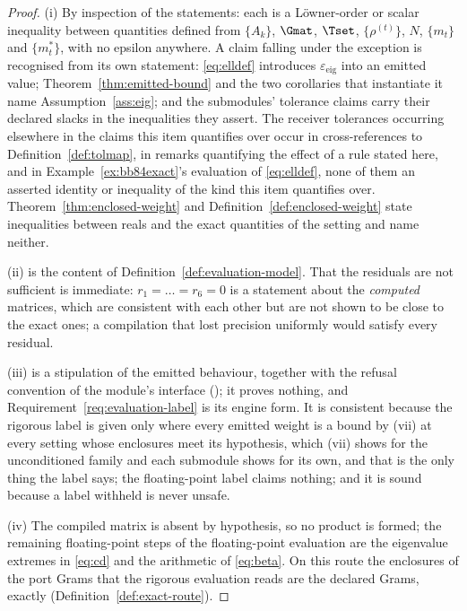 \begin{proof}
(i) By inspection of the statements: each is a Löwner-order or scalar
inequality between quantities defined from $\{A_k\}$, $\Gmat$, $\Tset$,
$\{\rho^{(t)}\}$, $N$, $\{m_t\}$ and $\{m^{\ast}_t\}$, with no epsilon
anywhere. A claim falling under the exception is recognised from its own
statement: \eqref{eq:elldef} introduces $\varepsilon_{\mathrm{eig}}$ into an
emitted value; Theorem~\ref{thm:emitted-bound} and the two corollaries that
instantiate it name Assumption~\ref{ass:eig}; and the submodules' tolerance
claims carry their declared slacks in the inequalities they assert. The
receiver tolerances occurring elsewhere in the claims this item quantifies over
occur in cross-references to Definition~\ref{def:tolmap}, in remarks
quantifying the effect of a rule stated here, and in
Example~\ref{ex:bb84exact}'s evaluation of \eqref{eq:elldef}, none of them an
asserted identity or inequality of the kind this item quantifies over.
Theorem~\ref{thm:enclosed-weight} and Definition~\ref{def:enclosed-weight}
state inequalities between reals and the exact quantities of the setting and
name neither.

(ii) is the content of Definition~\ref{def:evaluation-model}. That the residuals are not
sufficient is immediate: $r_1=\dots=r_6=0$ is a statement about the
\emph{computed} matrices, which are consistent with each other but are not
shown to be close to the exact ones; a compilation that lost precision
uniformly would satisfy every residual.

(iii) is a stipulation of the emitted behaviour, together with the refusal
convention of the module's interface
(); it proves nothing, and
Requirement~\ref{req:evaluation-label} is its engine form. It is consistent
because the rigorous label is given only where every emitted weight is a bound
by (vii) at every setting whose enclosures meet its hypothesis, which (vii)
shows for the unconditioned family and each submodule shows for its own, and
that is the only thing the label says; the floating-point label claims
nothing; and it is sound because a label withheld is never unsafe.

(iv) The compiled matrix is absent by hypothesis, so no product is formed; the
remaining floating-point steps of the floating-point evaluation are the
eigenvalue extremes in \eqref{eq:cd} and the arithmetic of \eqref{eq:beta}. On
this route the enclosures of the port Grams that the rigorous evaluation reads
are the declared Grams, exactly (Definition~\ref{def:exact-route}).


\end{proof}
